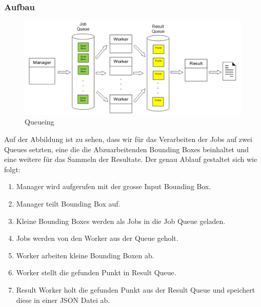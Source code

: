 \subsubsection{Aufbau}
\label{subsec:ablauf}
\begin{figure}[H]
\includegraphics[width=\textwidth]{images/queuing.png}
\caption[Queueing]{Queueing}
\end{figure}
Auf der Abbildung ist zu sehen, dass wir für das Verarbeiten der Jobs auf zwei Queues setzten, eine die die Abzuarbeitenden Bounding Boxes beinhaltet und eine weitere für das Sammeln der Resultate. Der genau Ablauf gestaltet sich wie folgt:
\begin{enumerate}
		\item Manager wird aufgerufen mit der grosse Input Bounding Box.
		\item Manager teilt Bounding Box auf.
		\item Kleine Bounding Boxes werden als Jobs in die Job Queue geladen.
		\item Jobs werden von den Worker aus der Queue geholt.
		\item Worker arbeiten kleine Bounding Boxen ab.
		\item Worker stellt die gefunden Punkt in Result Queue.
		\item Result Worker holt die gefunden Punkt aus der Result Queue und speichert diese in einer JSON Datei ab. 
\end{enumerate}









